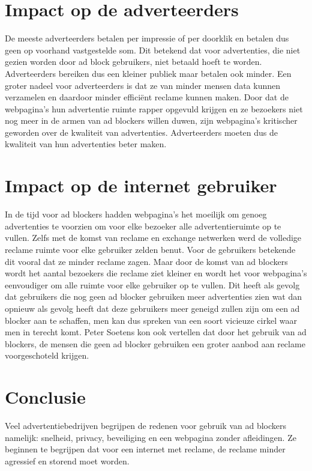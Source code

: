 \documentclass[pdftex,a4paper,12pt,twoside]{report}
\begin{document}
\section{Impact op de adverteerders}
\label{sec:Impact op de adverteerders}
De meeste adverteerders betalen per impressie of per doorklik en betalen dus geen op voorhand vastgestelde som. Dit betekend dat voor advertenties, die niet gezien worden door ad block gebruikers, niet betaald hoeft te worden. Adverteerders bereiken dus een kleiner publiek maar betalen ook minder. Een groter nadeel voor adverteerders is dat ze van minder mensen data kunnen verzamelen en daardoor minder efficiënt reclame kunnen maken.
Door dat de webpagina's hun advertentie ruimte rapper opgevuld krijgen en ze bezoekers niet nog meer in de armen van ad blockers willen duwen, zijn webpagina's 
kritischer geworden over de kwaliteit van advertenties. Adverteerders moeten dus de kwaliteit van hun advertenties beter maken.
\section{Impact op de internet gebruiker}
\label{sec:Impact op de internet gebruiker}
In de tijd voor ad blockers hadden webpagina's het moeilijk om genoeg advertenties te voorzien om voor elke bezoeker alle advertentieruimte op te vullen. Zelfs met de komst van reclame en exchange netwerken werd de volledige reclame ruimte voor elke gebruiker zelden benut. Voor de gebruikers betekende dit vooral dat ze minder reclame zagen. Maar door de komst van ad blockers wordt het aantal bezoekers die reclame ziet kleiner en wordt het voor webpagina's eenvoudiger om alle ruimte voor elke gebruiker op te vullen. Dit heeft als gevolg dat gebruikers die nog geen ad blocker gebruiken meer advertenties zien wat dan opnieuw als gevolg heeft dat deze gebruikers meer geneigd zullen zijn om een ad blocker aan te schaffen, men kan dus spreken van een soort vicieuze cirkel waar men in terecht komt. Peter Soetens kon ook vertellen dat door het gebruik van ad blockers, de mensen die geen ad blocker gebruiken een groter aanbod aan reclame voorgeschoteld krijgen.

\section{Conclusie}
\label{sec Conclusie}
Veel advertentiebedrijven begrijpen de redenen voor gebruik van ad blockers namelijk: snelheid, privacy, beveiliging en een webpagina zonder afleidingen. Ze beginnen te begrijpen dat voor een internet met reclame, de reclame minder agressief en storend moet worden.
\end{document}
